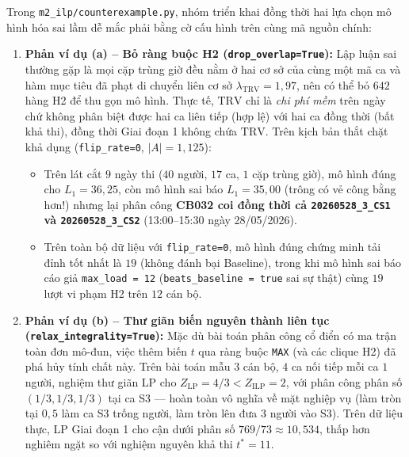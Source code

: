 Trong \texttt{m2\_\allowbreak ilp/\allowbreak counterexample.py}, nhóm triển khai đồng thời hai lựa chọn mô hình hóa sai lầm dễ mắc phải bằng cờ cấu hình trên cùng mã nguồn chính:

\begin{enumerate}
    \item \textbf{Phản ví dụ (a) -- Bỏ ràng buộc H2 (\texttt{drop\_\allowbreak overlap=True}):} Lập luận sai thường gặp là mọi cặp trùng giờ đều nằm ở hai cơ sở của cùng một mã ca và hàm mục tiêu đã phạt di chuyển liên cơ sở $\lambda_{\text{TRV}} = 1{,}97$, nên có thể bỏ $642$ hàng H2 để thu gọn mô hình. Thực tế, $\text{TRV}$ chỉ là \textit{chi phí mềm} trên ngày chứ không phân biệt được hai ca liên tiếp (hợp lệ) với hai ca đồng thời (bất khả thi), đồng thời Giai đoạn 1 không chứa $\text{TRV}$. Trên kịch bản thắt chặt khả dụng (\texttt{flip\_rate=0}, $|A|=1{,}125$):
    \begin{itemize}
        \item Trên lát cắt $9$ ngày thi ($40$ người, $17$ ca, $1$ cặp trùng giờ), mô hình đúng cho $L_1 = 36{,}25$, còn mô hình sai báo $L_1 = 35{,}00$ (trông có vẻ công bằng hơn!) nhưng lại phân công \textbf{CB032 coi đồng thời cả \texttt{20260528\_3\_CS1} và \texttt{20260528\_3\_CS2}} (13:00--15:30 ngày 28/05/2026).
        \item Trên toàn bộ dữ liệu với \texttt{flip\_rate=0}, mô hình đúng chứng minh tải đỉnh tốt nhất là $19$ (không đánh bại Baseline), trong khi mô hình sai báo cáo giả \texttt{max\_load = 12} (\texttt{beats\_baseline = true} sai sự thật) cùng $19$ lượt vi phạm H2 trên $12$ cán bộ.
    \end{itemize}
    \item \textbf{Phản ví dụ (b) -- Thư giãn biến nguyên thành liên tục (\texttt{relax\_\allowbreak integrality=True}):} Mặc dù bài toán phân công cổ điển có ma trận toàn đơn mô-đun, việc thêm biến $t$ qua ràng buộc \texttt{MAX} (và các clique H2) đã phá hủy tính chất này. Trên bài toán mẫu $3$ cán bộ, $4$ ca nối tiếp mỗi ca $1$ người, nghiệm thư giãn LP cho $Z_{\text{LP}} = 4/3 < Z_{\text{ILP}} = 2$, với phân công phân số $(1/3, 1/3, 1/3)$ tại ca S3 --- hoàn toàn vô nghĩa về mặt nghiệp vụ (làm tròn tại $0{,}5$ làm ca S3 trống người, làm tròn lên đưa $3$ người vào S3). Trên dữ liệu thực, LP Giai đoạn 1 cho cận dưới phân số $769/73 \approx 10{,}534$, thấp hơn nghiêm ngặt so với nghiệm nguyên khả thi $t^* = 11$.
\end{enumerate}
\FloatBarrier